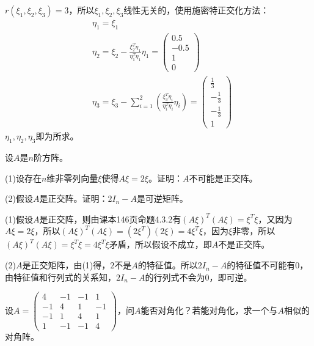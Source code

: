 \documentclass[a4paper]{report}
\begin{document}
\begin{jie}
$r(\xi_1,\xi_2,\xi_3)=3$，所以$\xi_1,\xi_2,\xi_3$线性无关的，使用施密特正交化方法：
\begin{align*}
&\eta_1=\xi_1\\
&\eta_2=\xi_2-
\frac{\xi_2^T\eta_1}{\eta_1^T\eta_1}\eta_1=
\begin{pmatrix}
0.5\\-0.5\\1\\0
\end{pmatrix}\\
&\eta_3=\xi_3-\sum_{i=1}^{2}\left(
\frac{\xi_3^T\eta_i}{\eta_i^T\eta_i}\eta_i\right)=
\begin{pmatrix}
\frac{1}{3}\\-\frac{1}{3}\\-\frac{1}{3}\\1
\end{pmatrix}
\end{align*}
$\eta_1,\eta_2,\eta_3$即为所求。
\end{jie}

\EX 设$A$是$n$阶方阵。

(1)设存在$n$维非零列向量$\xi$使得$A\xi=2\xi$。证明：$A$不可能是正交阵。

(2)假设$A$是正交阵。证明：$2I_{n}-A$是可逆矩阵。

\begin{zhengming}
(1)假设$A$是正交阵，则由课本146页命题4.3.2有$(A\xi)^T(A\xi)=\xi^T\xi$，又因为$A\xi=2\xi$，所以$(A\xi)^T(A\xi)= (2\xi^T)(2\xi)=4\xi^T\xi$，因为$\xi$非零，所以$(A\xi)^T(A\xi)= \xi^T\xi=4\xi^T\xi$矛盾，所以假设不成立，即$A$不是正交阵。

(2)$A$是正交矩阵，由(1)得，$2$不是$A$的特征值。所以$2I_n-A$的特征值不可能有0，由特征值和行列式的关系知，$2I_{n}-A$的行列式不会为0，即可逆。
\end{zhengming}

\EX 设$A=
\begin{pmatrix}
4&-1&-1&1\\
-1&4&1&-1\\
-1&1&4&1\\
1&-1&-1&4
\end{pmatrix}$，问$A$能否对角化？若能对角化，求一个与$A$相似的对角阵。
\end{document}
